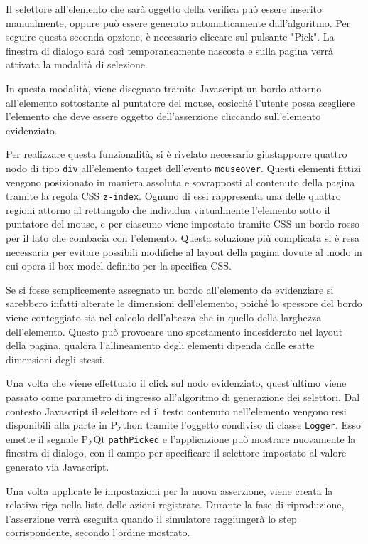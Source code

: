 \documentclass[12pt]{toptesi}
\begin{document}
Il selettore all'elemento che sarà oggetto della verifica può essere inserito manualmente, oppure può essere generato automaticamente dall'algoritmo. Per seguire questa seconda opzione, è necessario cliccare sul pulsante "Pick". La finestra di dialogo sarà così temporaneamente nascosta e sulla pagina verrà attivata la modalità di selezione. 

In questa modalità, viene disegnato tramite Javascript un bordo attorno all'elemento sottostante al puntatore del mouse, cosicché l'utente possa scegliere l'elemento che deve essere oggetto dell'asserzione cliccando sull'elemento evidenziato.

Per realizzare questa funzionalità, si è rivelato necessario giustapporre quattro nodo di tipo \verb|div| all'elemento target dell'evento \verb|mouseover|. Questi elementi fittizi vengono posizionato in maniera assoluta e sovrapposti al contenuto della pagina tramite la regola CSS \verb|z-index|. Ognuno di essi rappresenta una delle quattro regioni attorno al rettangolo che individua virtualmente l'elemento sotto il puntatore del mouse, e per ciascuno viene impostato tramite CSS un bordo rosso per il lato che combacia con l'elemento. Questa soluzione più complicata si è resa necessaria per evitare possibili modifiche al layout della pagina dovute al modo in cui opera il box model definito per la specifica CSS. 

Se si fosse semplicemente assegnato un bordo all'elemento da evidenziare si sarebbero infatti alterate le dimensioni dell'elemento, poiché lo spessore del bordo viene conteggiato sia nel calcolo dell'altezza che in quello della larghezza dell'elemento. Questo può provocare uno spostamento indesiderato nel layout della pagina, qualora l'allineamento degli elementi dipenda dalle esatte dimensioni degli stessi.

Una volta che viene effettuato il click sul nodo evidenziato, quest'ultimo viene passato come parametro di ingresso all'algoritmo di generazione dei selettori. Dal contesto Javascript il selettore ed il testo contenuto nell'elemento vengono resi disponibili alla parte in Python tramite l'oggetto condiviso di classe \verb|Logger|. Esso emette il segnale PyQt \verb|pathPicked| e l'applicazione può mostrare nuovamente la finestra di dialogo, con il campo per specificare il selettore impostato al valore generato via Javascript.

Una volta applicate le impostazioni per la nuova asserzione, viene creata la relativa riga nella lista delle azioni registrate. Durante la fase di riproduzione, l'asserzione verrà eseguita quando il simulatore raggiungerà lo step corrispondente, secondo l'ordine mostrato.
\end{document}
